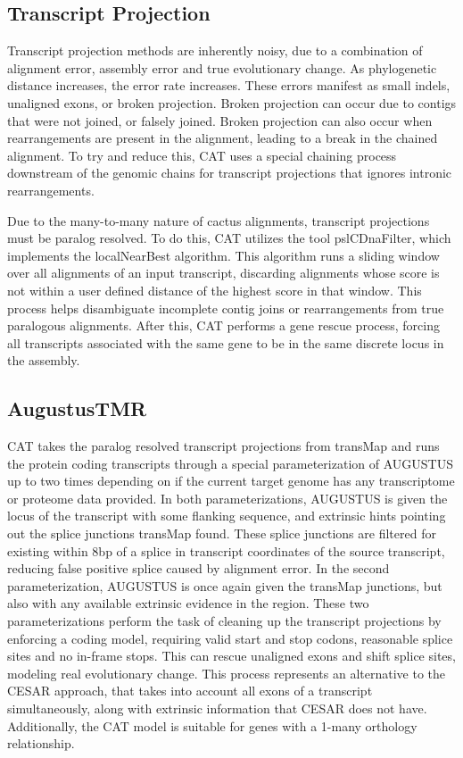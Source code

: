 \documentclass[fleqn,10pt]{wlscirep}
\begin{document}
\subsection*{Transcript Projection}
Transcript projection methods are inherently noisy, due to a combination of alignment error, assembly error and true evolutionary change. As phylogenetic distance increases, the error rate increases. These errors manifest as small indels, unaligned exons, or broken projection. Broken projection can occur due to contigs that were not joined, or falsely joined. Broken projection can also occur when rearrangements are present in the alignment, leading to a break in the chained alignment. To try and reduce this, CAT uses a special chaining process downstream of the genomic chains for transcript projections that ignores intronic rearrangements.

Due to the many-to-many nature of cactus alignments, transcript projections must be paralog resolved. To do this, CAT utilizes the tool pslCDnaFilter, which implements the localNearBest algorithm. This algorithm runs a sliding window over all alignments of an input transcript, discarding alignments whose score is not within a user defined distance of the highest score in that window. This process helps disambiguate incomplete contig joins or rearrangements from true paralogous alignments. After this, CAT performs a gene rescue process, forcing all transcripts associated with the same gene to be in the same discrete locus in the assembly.

\subsection*{AugustusTMR}

CAT takes the paralog resolved transcript projections from transMap and runs the protein coding transcripts through a special parameterization of AUGUSTUS up to two times depending on if the current target genome has any transcriptome or proteome data provided. In both parameterizations, AUGUSTUS is given the locus of the transcript with some flanking sequence, and extrinsic hints pointing out the splice junctions transMap found. These splice junctions are filtered for existing within 8bp of a splice in transcript coordinates of the source transcript, reducing false positive splice caused by alignment error. In the second parameterization, AUGUSTUS is once again given the transMap junctions, but also with any available extrinsic evidence in the region. These two parameterizations perform the task of cleaning up the transcript projections by enforcing a coding model, requiring valid start and stop codons, reasonable splice sites and no in-frame stops. This can rescue unaligned exons and shift splice sites, modeling real evolutionary change. This process represents an alternative to the CESAR approach, that takes into account all exons of a transcript simultaneously, along with extrinsic information that CESAR does not have. Additionally, the CAT model is suitable for genes with a 1-many orthology relationship.
\end{document}
